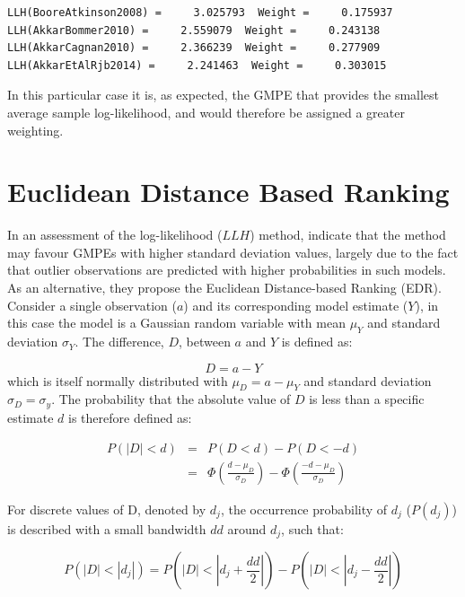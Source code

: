 \begin{verbatim}
LLH(BooreAtkinson2008) =     3.025793  Weight =     0.175937
LLH(AkkarBommer2010) =     2.559079  Weight =     0.243138
LLH(AkkarCagnan2010) =     2.366239  Weight =     0.277909
LLH(AkkarEtAlRjb2014) =     2.241463  Weight =     0.303015
\end{verbatim}

In this particular case it is, as expected, the \cite{Akkar_etal2014} GMPE that provides the smallest average sample log-likelihood, and would therefore be assigned a greater weighting.

\section{Euclidean Distance Based Ranking \cite{KaleAkkar2013}}
\label{sec:edr}

In an assessment of the log-likelihood ($LLH$) method, \cite{KaleAkkar2013} indicate that the method may favour GMPEs with higher standard deviation values, largely due to the fact that outlier observations are predicted with higher probabilities in such models. As an alternative, they propose the Euclidean Distance-based Ranking (EDR). Consider a single observation ($a$) and its corresponding model estimate ($Y$), in this case the model is a Gaussian random variable with mean $\mu_Y$ and standard deviation $\sigma_Y$. The difference, $D$, between $a$ and $Y$ is defined as:

\begin{equation}
D = a - Y
\end{equation}
\noindent which is itself normally distributed with $\mu_D = a - \mu_Y$ and standard deviation $\sigma_D = \sigma_y$. The probability that the absolute value of $D$ is less than a specific estimate $d$ is therefore defined as:

\begin{eqnarray}
P \left( {|D| < d} \right) &=& P \left( {D < d} \right) - P \left( {D < -d} \right) \nonumber \\
 &=& \Phi \left( {\frac{d - \mu_D}{\sigma_D}} \right) - \Phi \left( {\frac{-d - \mu_D}{\sigma_D}} \right)
\end{eqnarray}

For discrete values of D, denoted by $d_j$, the occurrence probability of $d_j$ ($P \left( {d_j} \right)$) is described with a small bandwidth $dd$ around $d_j$, such that:

\begin{equation}
P \left( {|D| < |d_j|} \right) = P \left( {|D| < |d_j + \frac{dd}{2}|} \right) - P \left( {|D| < |d_j - \frac{dd}{2}|} \right)
\end{equation}

